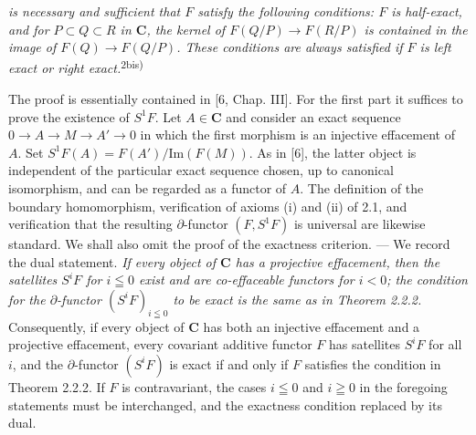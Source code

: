 
\noindent\textit{is necessary and sufficient that $F$ satisfy the following
conditions: $F$ is half-exact, and for $P\subset Q\subset R$ in $\mathbf{C}$, the
kernel of $F(Q/P)\to F(R/P)$ is contained in the image of
$F(Q)\to F(Q/P)$. These conditions are always satisfied if $F$
is left exact or right exact.}\textsuperscript{2bis)}

The proof is essentially contained in [6, Chap. III]. For the first part it
suffices to prove the existence of $S^1F$. Let $A\in \mathbf{C}$ and consider an exact
sequence
$0\to A\to M\to A'\to0$ in
which the first morphism is an injective effacement of $A$. Set
$S^1F(A)=F(A')/\mathrm{Im}(F(M))$. As in [6], the latter object is independent
of the particular exact sequence chosen, up to canonical isomorphism, and can
be regarded as a functor of $A$. The definition of the boundary
homomorphism, verification of axioms (i) and (ii) of 2.1, and verification
that the resulting $\partial$-functor $(F,S^1F)$ is universal are likewise
standard. We shall also omit the proof of the exactness criterion.
--- We record the dual statement. \textit{If every object of $\mathbf{C}$ has a
projective effacement, then the satellites $S^iF$ for $i\leqq0$ exist and are
co-effaceable functors for $i<0$; the condition for the $\partial$-functor
$(S^iF)_{i\leqq0}$ to be exact is the same as in Theorem \textup{2.2.2}.} Consequently,
if every object of $\mathbf{C}$ has both an injective effacement and a projective
effacement, every covariant additive functor $F$ has satellites $S^iF$ for
all $i$, and the $\partial$-functor $(S^iF)$ is exact if and only if $F$
satisfies the condition in Theorem 2.2.2. If $F$ is contravariant, the
cases $i\leqq0$ and $i\geqq0$ in the foregoing statements must be interchanged,
and the exactness condition replaced by its dual.

